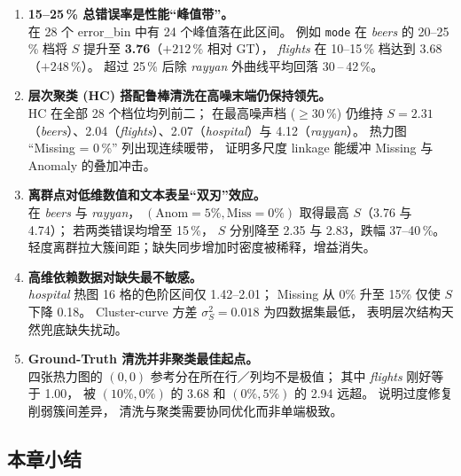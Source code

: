 \documentclass[10pt]{article} %
\numberwithin{equation}{section}
\begin{document}
\begin{enumerate}[label=\textbf{\arabic*.},leftmargin=2.4em]

  \item \textbf{15–25\,\% 总错误率是性能“峰值带”。}\\
        在 28 个 error\_bin 中有 24 个峰值落在此区间。%
        例如 \texttt{mode} 在 \emph{beers} 的 20–25\,\% 档将 \(S\) 提升至
        \textbf{3.76}（\(+212\,\%\) 相对 GT），%
        \emph{flights} 在 10–15\,\% 档达到 3.68（\(+248\,\%\)）。%
        超过 25\,\% 后除 \emph{rayyan} 外曲线平均回落 30 – 42\,\%。%

  \item \textbf{层次聚类 (HC) 搭配鲁棒清洗在高噪末端仍保持领先。}\\
        HC 在全部 28 个档位均列前二；%
        在最高噪声档 (\(\ge30\,\%\)) 仍维持
        \(S=2.31\)（\emph{beers}）、2.04（\emph{flights}）、2.07（\emph{hospital}）与 4.12（\emph{rayyan}）。%
        热力图 “Missing = 0\,\%” 列出现连续暖带，
        证明多尺度 linkage 能缓冲 Missing 与 Anomaly 的叠加冲击。

  \item \textbf{离群点对低维数值和文本表呈“双刃”效应。}\\
        在 \emph{beers} 与 \emph{rayyan}，
        \((\text{Anom}=5\%,\text{Miss}=0\%)\) 取得最高 \(S\)（3.76 与 4.74）；%
        若两类错误均增至 15\,\%，%
        \(S\) 分别降至 2.35 与 2.83，跌幅 37–40\,\%。%
        轻度离群拉大簇间距；缺失同步增加时密度被稀释，增益消失。

  \item \textbf{高维依赖数据对缺失最不敏感。}\\
        \emph{hospital} 热图 16 格的色阶区间仅 1.42–2.01；%
        Missing 从 0\% 升至 15\% 仅使 \(S\) 下降 0.18。%
        Cluster-curve 方差 \(\sigma_S^2=0.018\) 为四数据集最低，%
        表明层次结构天然兜底缺失扰动。

  \item \textbf{Ground-Truth 清洗并非聚类最佳起点。}\\
        四张热力图的 \((0,0)\) 参考分在所在行／列均不是极值；%
        其中 \emph{flights} 刚好等于 1.00，%
        被 \((10\%,0\%)\) 的 3.68 和 \((0\%,5\%)\) 的 2.94 远超。%
        说明过度修复削弱簇间差异，%
        清洗与聚类需要协同优化而非单端极致。
\end{enumerate}

\subsection{\textcolor[rgb]{0.00,0.07,1.00}{本章小结}}
\end{document}
